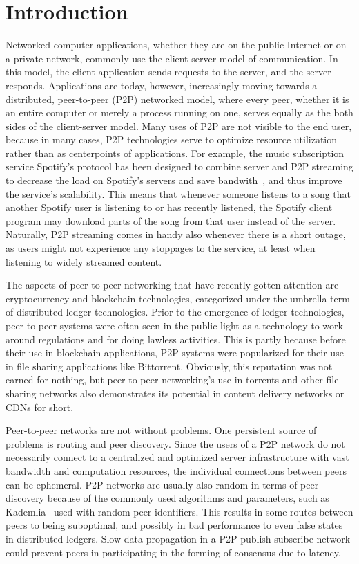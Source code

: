 \chapter{Introduction}
\label{Introduction}

Networked computer applications, whether they are on the public Internet or on a private network, commonly use the client-server model of communication. In this model, the client application sends requests to the server, and the server responds. Applications are today, however, increasingly moving towards a distributed, peer-to-peer (P2P) networked model, where every peer, whether it is an entire computer or merely a process running on one, serves equally as the both sides of the client-server model. Many uses of P2P are not visible to the end user, because in many cases, P2P technologies serve to optimize resource utilization rather than as centerpoints of applications. For example, the music subscription service Spotify's protocol has been designed to combine server and P2P streaming to decrease the load on Spotify's servers and save bandwith~\cite{Kreitz_undated-yp}, and thus improve the service's scalability. This means that whenever someone listens to a song that another Spotify user is listening to or has recently listened, the Spotify client program may download parts of the song from that user instead of the server. Naturally, P2P streaming comes in handy also whenever there is a short outage, as users might not experience any stoppages to the service, at least when listening to widely streamed content.

The aspects of peer-to-peer networking that have recently gotten attention are cryptocurrency and blockchain technologies, categorized under the umbrella term of distributed ledger technologies. Prior to the emergence of ledger technologies, peer-to-peer systems were often seen in the public light as a technology to work around regulations and for doing lawless activities. This is partly because before their use in blockchain applications, P2P systems were popularized for their use in file sharing applications like Bittorrent. Obviously, this reputation was not earned for nothing, but peer-to-peer networking's use in torrents and other file sharing networks also demonstrates its potential in content delivery networks or CDNs for short.

Peer-to-peer networks are not without problems. One persistent source of problems is routing and peer discovery. Since the users of a P2P network do not necessarily connect to a centralized and optimized server infrastructure with vast bandwidth and computation resources, the individual connections between peers can be ephemeral. P2P networks are usually also random in terms of peer discovery because of the commonly used algorithms and parameters, such as Kademlia~\cite{Maymounkov2002-sx} used with random peer identifiers. This results in some routes between peers to being suboptimal, and possibly in bad performance to even false states in distributed ledgers. Slow data propagation in a P2P publish-subscribe network could prevent peers in participating in the forming of consensus due to latency.


